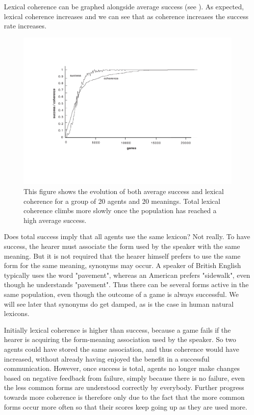Lexical coherence can be graphed alongside
average success (see ). As expected, 
lexical coherence increases 
and we can see that as coherence increases the success
rate increases.
\begin{figure}[htbp]
  \centerline{\includegraphics[width=.70\textwidth]{chap5/figs/suc-coh}}
\caption{\label{suc-coh}This figure shows the evolution of both average
success and lexical coherence for a group of 20 agents and 20 
meanings. Total lexical coherence climbs more slowly
once the 
population has reached a high average success.}
\end{figure}
Does total success imply that all agents use the 
same lexicon? Not really. To have success, the hearer
must associate the form used by the speaker
with the same meaning. But it is not required that the
hearer himself prefers to use the same form for the same meaning, 
synonyms may occur.  
A speaker of British English typically uses the word "pavement", 
whereas an American prefers "sidewalk", even though he
understands "pavement". Thus there can 
be several forms active in the same population, even though 
the outcome of a game is always successful. We will see 
later that synonyms do get damped, as is the case in 
human natural lexicons. 

Initially lexical coherence is higher than success, because a game 
fails if the hearer is acquiring the form-meaning association
used by the speaker. So two agents could have stored the same association, 
and thus coherence would have increased, without already having enjoyed the benefit
in a successful communication. However, once success
is total, agents no longer make changes based on negative feedback
from failure, simply because there is no failure,  
even the less common forms are understood correctly 
by everybody. Further progress towards more coherence
is therefore only due to the 
fact that the more common forms occur more often so that
their scores keep going up as they are used more. 

